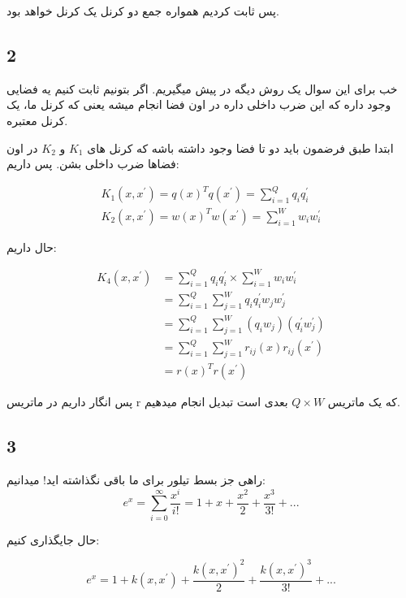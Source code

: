 \documentclass{article}[12pt]
\begin{document}
پس ثابت کردیم همواره جمع دو کرنل یک کرنل خواهد بود. 
\clearpage
\subsection{2}


خب برای این سوال یک روش دیگه در پیش میگیریم. اگر بتونیم ثابت کنیم یه فضایی وجود داره که این ضرب داخلی داره در اون فضا انجام میشه یعنی که 
کرنل ما، یک کرنل معتبره. 

ابتدا طبق فرضمون باید دو تا فضا وجود داشته باشه که کرنل های 
$K_1$
و 
$K_2$
در اون فضاها ضرب داخلی بشن. پس داریم:

\begin{gather}
K_1(x,x^\prime) = q(x)^T q(x^\prime) = \sum_{i=1}^{Q} q_i q_i^\prime \\
K_2(x,x^\prime) = w(x)^T w(x^\prime) = \sum_{i=1}
^{W} w_i w_i^\prime 
\end{gather}

حال داریم:

\begin{equation}
\begin{split}
K_4(x,x^\prime) &=\sum_{i=1}^{Q} q_i q_i^\prime 
\times \sum_{i=1} ^{W} w_i w_i^\prime \\
&= \sum_{i=1}^{Q} \sum_{j=1} ^{W} q_i q_i^\prime w_j w_j^\prime \\
&= \sum_{i=1}^{Q} \sum_{j=1} ^{W} (q_i w_j) (q_i^\prime w_j^\prime) \\
&= \sum_{i=1}^{Q} \sum_{j=1} ^{W} r_{ij}(x) r_{ij}(x^\prime) \\ 
&= r(x)^T r(x^\prime)
\end{split}
\end{equation}

پس انگار داریم 
در ماتریس r
که یک ماتریس
$Q \times W$
بعدی است تبدیل انجام میدهیم.

\clearpage
\subsection{3}

راهی جز بسط تیلور برای ما باقی نگذاشته اید! 
میدانیم: 
\begin{equation}
e^x = \sum_{i=0}^{\infty} \frac{x^i}{i!} = 
1+ x + \frac{x^2}{2} + \frac{x^3}{3!} + ... 
\end{equation}

حال جایگذاری کنیم:

\begin{equation}
e^x = 1+ k(x,x^\prime) + \frac{k(x,x^\prime)^2}{2} + 
\frac{k(x,x^\prime)^3}{3!} + ...
\end{equation}
\end{document}
